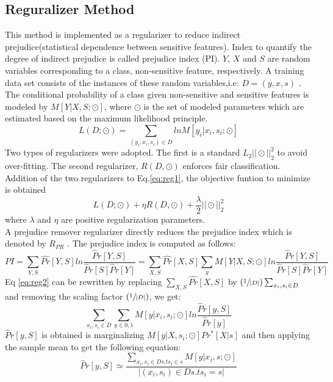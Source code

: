\documentclass[runningheads]{llncs}
\begin{document}
\subsection{Reguralizer Method}
This method is implemented as a regularizer to reduce indirect prejudice(statistical dependence between sensitive features). Index to quantify the degree of indirect prejudice is called prejudice index (PI). $Y$, $X$ and $S$ are random variables corresponding to a class, non-sensitive feature, respectively. A training data set consists of the instances of these random variables,i.e: $D = {(y,x,s)}$ \cite{kamishima2012fairness}. The conditional probability of a class given non-sensitive and sensitive features is modeled by $M[Y|X,S;\odot]$, where $\odot$ is the set of modeled parameters which are estimated based on the maximum likelihood principle.
\begin{equation}
L(D;\odot) = \sum_{(y_i,x_i,s_i)\in D}{lnM[y_i|x_i,s_i;\odot]}
\label{eq:reg1}
\end{equation}
Two types of regularizers were adopted. The first is a standard $L_2 ||\odot||_2^2$ to avoid over-fitting. The second regularizer, $R(D,\odot)$ enforces fair classification. Addition of the two regularizers to Eq.\ref{eq:reg1}, the objective funtion to minimize is obtained
\begin{equation}
L(D;\odot) + \eta R(D,\odot)+\frac{\lambda}{2}||\odot||_2^2
\end{equation} 
where $\lambda$ and $\eta$ are positive regularization parameters.\\
A prejudice remover regularizer directly reduces the prejudice index which is denoted by $R_{PR}$  \cite{kamishima2012fairness}. The prejudice index is computed as follows:
\begin{equation}
PI = \sum_{Y,S}{\hat{Pr}[Y,S]ln\frac{\hat{P}r[Y,S]}{\hat{P}r[S]\hat{P}r[Y]}} = \sum_{X,S}{\hat{Pr}[X,S]}\sum_{y}{M[Y|X,S;\odot]}ln\frac{\hat{P}r[Y,S]}{\hat{P}r[S]\hat{P}r[Y]}
\label{eq:reg2}
\end{equation}
Eq \ref{eq:reg2} can be rewritten by replacing $\sum_{X,S}{\hat{Pr}[X,S]}$ by $(\sfrac{1}{|D|})\sum_{x_i,s_i \in D}$ and removing the scaling factor $(\sfrac{1}{|D|})$, we get:
\begin{equation}
\sum_{x_i,s_i \in D}\sum_{y \in {0,1}}M[y|x_i,s_i;\odot]ln\frac{\hat{P}r[y,S]}{\hat{P}r[y]}
\end{equation}
${\hat{P}r[y,S]}$ is obtained is marginalizing $M[y|X,s_i;\odot]Pr^*[X|s]$ and then applying the sample mean to get the following equation:
\begin{equation}
{\hat{P}r[y,S]} \simeq \frac{\sum_{x_i,s_i \in D s.t s_i \in s}M[y|x_i,s;\odot]}{|{(x_i,s_i) \in D s.t s_i = s}|}
\label{eq:reg3}
\end{equation}
\end{document}
